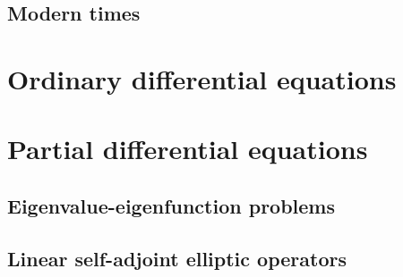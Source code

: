 \subsection{Modern times}

\section{Ordinary differential equations}


\section{Partial differential equations}


\subsection{Eigenvalue-eigenfunction problems}

\subsection{Linear self-adjoint elliptic operators}\label{sec:c1_selfadjoint}



\begin{theorem}
\end{theorem}

\begin{theorem}
\end{theorem}

\begin{theorem}
\end{theorem}

\stopchapter
